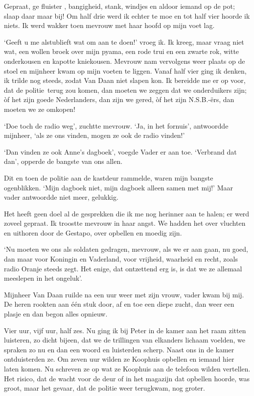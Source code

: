 \documentclass{book}
\begin{document}
Gepraat, ge fluister , bangigheid, stank, windjes en aldoor iemand op de pot;
slaap daar maar bij! Om half drie werd ik echter te moe en tot half vier hoorde
ik niets. Ik werd wakker toen mevrouw met haar hoofd op mijn voet lag.

`Geeft u me alstublieft wat om aan te doen!' vroeg ik. Ik kreeg, maar vraag niet
wat, een wollen broek over mijn pyama, een rode trui en een zwarte rok, witte
onderkousen en kapotte kniekousen. Mevrouw nam vervolgens weer plaats op de
stoel en mijnheer kwam op mijn voeten te liggen. Vanaf half vier ging ik denken,
ik trilde nog steeds, zodat Van Daan niet slapen kon. Ik bereidde me er op voor,
dat de politie~terug zou komen, dan moeten we zeggen dat we onderduikers zijn;
òf het zijn goede Nederlanders, dan zijn we gered, òf het zijn N.S.B.-ërs, dan
moeten we ze omkopen!

`Doe toch de radio weg', zuchtte mevrouw. `Ja, in het fornuis', antwoordde
mijnheer, `als ze ons vinden, mogen ze ook de radio vinden!'

`Dan vinden ze ook Anne's dagboek', voegde Vader er aan toe. `Verbrand dat dan',
opperde de bangste van ons allen.

Dit en toen de politie aan de kastdeur rammelde, waren mijn bangste ogenblikken.
`Mijn dagboek niet, mijn dagboek alleen samen met mij!' Maar vader antwoordde
niet meer, gelukkig.

Het heeft geen doel al de gesprekken die ik me nog herinner aan te halen; er
werd zoveel gepraat. Ik troostte mevrouw in haar angst. We hadden het over
vluchten en uithoren door de Gestapo, over opbellen en moedig zijn.

`Nu moeten we ons als soldaten gedragen, mevrouw, als we er aan gaan, nu goed,
dan maar voor Koningin en Vaderland, voor vrijheid, waarheid en recht, zoals
radio Oranje steeds zegt. Het enige, dat ontzettend erg is, is dat we ze
allemaal meeslepen in het ongeluk'.

Mijnheer Van Daan ruilde na een uur weer met zijn vrouw, vader kwam bij mij. De
heren rookten aan één stuk door, af en toe een diepe zucht, dan weer een plasje
en dan begon alles opnieuw.

Vier uur, vijf uur, half zes. Nu ging ik bij Peter in de kamer aan het raam
zitten luisteren, zo dicht bijeen, dat we de trillingen van elkanders lichaam
voelden, we spraken zo nu en dan een woord en luisterden scherp. Naast ons in de
kamer ontduisterden ze. Om zeven uur wilden ze Koophuis opbellen en iemand hier
laten komen. Nu schreven ze op wat ze Koophuis aan de telefoon wilden vertellen.
Het risico, dat de wacht voor de deur of in het magazijn dat opbellen hoorde,
was groot, maar het gevaar, dat de politie weer terugkwam, nog groter.
\end{document}
